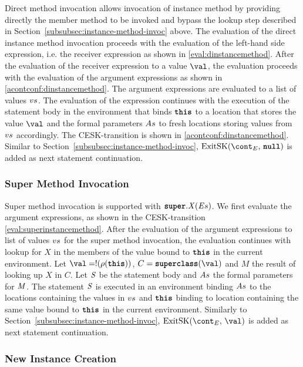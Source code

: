 \documentclass[a4paper,oneside,fleqn]{article}
\newcommand{\synt}[1]{\ensuremath{\text{\textbf{\texttt{#1}}}}}
\DeclareMathOperator{\nnull}{\synt{null}}
\DeclareMathOperator{\superclass}{\synt{superclass}}
\newcommand{\this}{\synt{this}}
\newcommand{\idmeta}{\ensuremath{\mathit{X}}}
\begin{document}
Direct method invocation allows invocation of instance method by providing directly the member method to be invoked and bypass the lookup step described in Section~\ref{subsubsec:instance-method-invoc} above.
The evaluation of the direct instance method invocation proceeds with the evaluation of the left-hand side expression, i.e. the receiver expression as shown in \eqref{eval:dinstancemethod}.
After the evaluation of the receiver expression to a value $\val$, the evaluation proceeds with the evaluation of the argument expressions as shown in \eqref{acontconf:dinstancemethod}.
The argument expressions are evaluated to a list of values $vs$.
The evaluation of the expression continues with the execution of the statement body in the environment that binds $\this$ to a location that stores the value $\val$ and the formal parameters $As$ to fresh locations storing values from $vs$ accordingly.
The CESK-transition is shown in \eqref{acontconf:dinstancemethod}.
Similar to Section~\ref{subsubsec:instance-method-invoc}, $\ExitSK{\nnull}$ is added as next statement continuation.


\subsubsection{Super Method Invocation}
\label{subsubsec:super-method-invoc}

Super method invocation is supported with $\SuperMethodInvocation{\idmeta}{\expressionsmeta}$.
We first evaluate the argument expressions, as shown in the CESK-transition \eqref{eval:superinstancemethod}.
After the evaluation of the argument expressions to list of values $vs$ for the super method invocation, the evaluation continues with lookup for $\idmeta$ in the members of the value bound to $\this$ in the current environment.
Let $\val = \deref{(\env(\this))}$, $C = \superclass(\val)$ and $M$ the result of looking up $\idmeta$ in $C$.
Let $\mathit{S}$ be the statement body and $As$ the formal parameters for $\mathit{M}$.
The statement $\mathit{S}$ is executed in an environment binding $As$ to the locations containing the values in $vs$ and $\this$ binding to location containing the same value bound to $\this$ in the current environment.
Similarly to Section~\ref{subsubsec:instance-method-invoc}, $\ExitSK{\val}$ is added as next statement continuation.


\subsubsection{New Instance Creation}
\label{subsubsec:new-instance}
\end{document}
